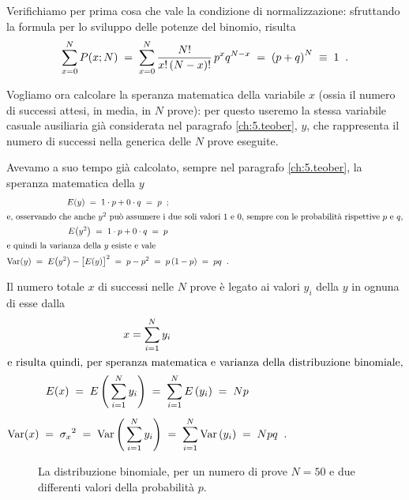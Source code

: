 Verifichiamo per prima cosa che vale la condizione di
normalizzazione: sfruttando la formula per lo sviluppo delle
potenze del binomio, risulta
\begin{equation*}
  \sum_{x=0}^N P(x;N) \; = \;
    \sum_{x=0}^N \frac{N!}{x! \, (N-x)!}
    \, p^x q^{N-x} \; = \;
    {(p+q)}^N \; \equiv \; 1 \;\; .
\end{equation*}

Vogliamo ora calcolare la speranza matematica della
variabile $x$ (ossia il numero di successi attesi, in media,
in $N$ prove): per questo useremo la stessa variabile
casuale ausiliaria gi\`a considerata nel paragrafo
\ref{ch:5.teober}, $y$, che rappresenta il numero di
successi nella generica delle $N$ prove eseguite.

Avevamo a suo tempo gi\`a calcolato, sempre nel paragrafo
\ref{ch:5.teober}, la speranza matematica della $y$
\begin{gather}
  E ( y ) \; = \; 1 \cdot p + 0 \cdot q \;
    = \; p \;\; ; \notag \\
  \intertext{e, osservando che anche $y^2$
    pu\`o assumere i due soli valori 1 e 0, sempre
    con le probabilit\`a rispettive $p$ e $q$,}
  E \bigl( y^2 \bigr) \; = \; 1 \cdot p + 0
  \cdot q \; = \; p \notag \\
  \intertext{e quindi la varianza della $y$ esiste e vale}
  \operatorname{Var} ( y ) \; = \; E \bigl( y^2
    \bigr) - \bigl[ E ( y ) \bigr] ^2
    \; = \; p - p^2 \; = \; p \, (1-p) \;= \; pq \;\;
    \label{eq:8.varber} .
\end{gather}

Il numero totale $x$ di successi nelle $N$ prove \`e legato
ai valori $y_i$ della $y$ in ognuna di esse dalla
\begin{gather*}
  x = \sum_{i=1}^N y_i \\
  \intertext{e risulta quindi, per speranza matematica e
    varianza della distribuzione binomiale,}
  E(x) \; = \; E \left( \, \sum_{i=1}^N y_i
    \right) \; = \; \sum_{i=1}^N E \left( y_i
    \right) \; = \; Np \\[1ex]
  \operatorname{Var} (x) \; = \; {\sigma_x}^2 \; = \;
    \operatorname{Var} \left( \, \sum_{i=1}^N y_i \right) \; = \;
    \sum_{i=1}^N \operatorname{Var} \left( y_i \right) \; = \;
    Npq \;\; .
\end{gather*}

\begin{figure}[hbtp]
  \vspace*{2ex}
  \begin{center} {
    
  } \end{center}
  \caption[La distribuzione binomiale]
    {La distribuzione binomiale, per un numero
    di prove $N=50$ e due differenti valori della
    probabilit\`a $p$.}
  \label{fig:8.figbin}
\end{figure}

